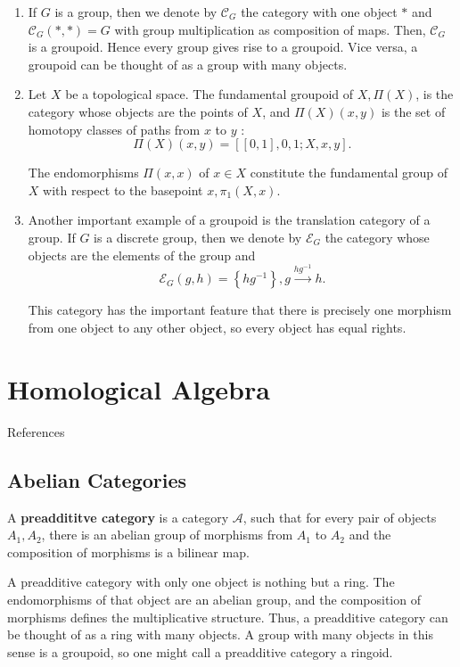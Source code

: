 \begin{example}
    \begin{enumerate}
        \item If $G$ is a group, then we denote by $\mathcal{C}_G$ the category with one object $*$ and $\mathcal{C}_G(*, *)=G$ with group multiplication as composition of maps. Then, $\mathcal{C}_G$ is a groupoid. Hence every group gives rise to a groupoid. Vice versa, a groupoid can be thought of as a group with many objects.
        \item Let $X$ be a topological space. The fundamental groupoid of $X, \Pi(X)$, is the category whose objects are the points of $X$, and $\Pi(X)(x, y)$ is the set of homotopy classes of paths from $x$ to $y$ :
        $$
        \Pi(X)(x, y)=[[0,1], 0,1 ; X, x, y] .
        $$
        
        The endomorphisms $\Pi(x, x)$ of $x \in X$ constitute the fundamental group of $X$ with respect to the basepoint $x, \pi_1(X, x)$.
        \item Another important example of a groupoid is the translation category of a group. If $G$ is a discrete group, then we denote by $\mathcal{E}_G$ the category whose objects are the elements of the group and $$\mathcal{E}_G(g, h)=\left\{h g^{-1}\right\}, g \xrightarrow{h g^{-1}} h.$$

        This category has the important feature that there is precisely one morphism from one object to any other object, so every object has equal rights.

    \end{enumerate}
\end{example}










\chapter{Homological Algebra}

References \cite{richterCategoriesHomotopyTheory2020,weibelKbookIntroductionAlgebraic2013a} 


\section{Abelian Categories}

A \textbf{preaddititve category} is a category $\mathcal{A}$, such that for every pair of objects $A_1, A_2$, there is an abelian group of morphisms from $A_1$ to $A_2$ and the composition of morphisms is a bilinear map.
\begin{example}
    A preadditive category with only one object is nothing but a ring. The endomorphisms of that object are an abelian group, and the composition of morphisms defines the multiplicative structure. Thus, a preadditive category can be thought of as a ring with many objects. A group with many objects in this sense is a groupoid, so one might call a preadditive category a ringoid.
\end{example}


